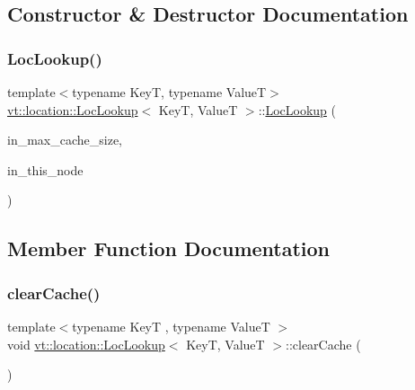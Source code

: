 \subsection{Constructor \& Destructor Documentation}
\mbox{\label{structvt_1_1location_1_1_loc_lookup_a27e5f79af811503f9c0652b9f1be35b8}} 
\subsubsection{\texorpdfstring{Loc\+Lookup()}{LocLookup()}}
{\footnotesize\ttfamily template$<$typename KeyT, typename ValueT$>$ \\
\hyperlink{structvt_1_1location_1_1_loc_lookup}{vt\+::location\+::\+Loc\+Lookup}$<$ KeyT, ValueT $>$\+::\hyperlink{structvt_1_1location_1_1_loc_lookup}{Loc\+Lookup} (\begin{DoxyParamCaption}\item[{\hyperlink{namespacevt_1_1location_ab1c4c5849012a23eee2fbd1fce6159d7}{Location\+Size\+Type} const \&}]{in\+\_\+max\+\_\+cache\+\_\+size,  }\item[{\hyperlink{namespacevt_a866da9d0efc19c0a1ce79e9e492f47e2}{Node\+Type}}]{in\+\_\+this\+\_\+node }\end{DoxyParamCaption})\hspace{0.3cm}{\ttfamily [inline]}}



\subsection{Member Function Documentation}
\mbox{\label{structvt_1_1location_1_1_loc_lookup_aae2c3e418b59b36c0a53da17fe7fb3b8}} 
\subsubsection{\texorpdfstring{clear\+Cache()}{clearCache()}}
{\footnotesize\ttfamily template$<$typename KeyT , typename ValueT $>$ \\
void \hyperlink{structvt_1_1location_1_1_loc_lookup}{vt\+::location\+::\+Loc\+Lookup}$<$ KeyT, ValueT $>$\+::clear\+Cache (\begin{DoxyParamCaption}{ }\end{DoxyParamCaption})}


